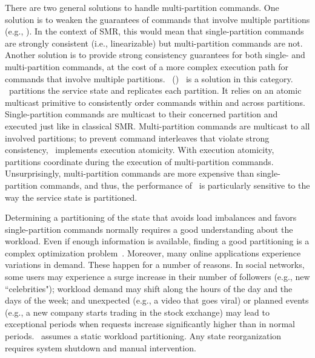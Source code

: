 There are two general solutions to handle multi-partition commands.
One solution is to weaken the guarantees of commands that involve multiple partitions (e.g., \cite{facebookTAO}).
In the context of SMR, this would mean that single-partition commands are strongly consistent (i.e., linearizable) but multi-partition commands are not.
Another solution is to provide strong consistency guarantees for both single- and multi-partition commands, at the cost of a more complex execution path for commands that involve multiple partitions.
\ssmrlong\ (\ssmr)~\cite{bezerra2014ssmr} is a solution in this category.
\ssmr\ partitions the service state and replicates each partition.
It relies on an atomic multicast primitive to consistently order commands within and across partitions. 
Single-partition commands are multicast to their concerned partition and executed just like in classical SMR.
Multi-partition commands are multicast to all involved partitions; to prevent command interleaves that violate strong consistency, \ssmr\ implements execution atomicity.
With execution atomicity, partitions coordinate during the execution of multi-partition commands.
Unsurprisingly, multi-partition commands are more expensive than single-partition commands, and thus, the performance of \ssmr\ is particularly sensitive to the way the service state is partitioned.

Determining a partitioning of the state that avoids load imbalances and favors single-partition commands normally requires a good understanding about the workload. 
Even if enough information is available, finding a good partitioning is a complex optimization problem~\cite{curino2010sch,taft2014est}.
Moreover, many online applications experience variations in demand. 
These happen for a number of reasons. 
In social networks, some users may experience a surge increase in their number of followers (e.g., new ``celebrities");
workload demand may shift along the hours of the day and the days of the week; and unexpected (e.g., a video that goes viral) or planned events (e.g., a new company starts trading in the stock exchange) may lead to exceptional periods when requests increase significantly higher than in normal periods.
\ssmr\ assumes a static workload partitioning.
Any state reorganization requires system shutdown and manual intervention.

